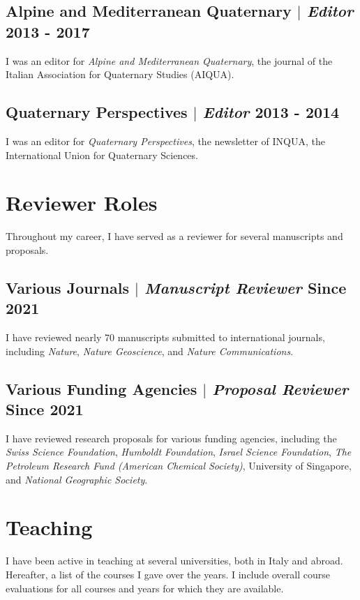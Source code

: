 \documentclass[11pt]{article}
\begin{document}
\subsection{Alpine and Mediterranean Quaternary $|$ {\normalfont\textit{Editor}} \hfill 2013 - 2017}
{\footnotesize I was an editor for \textit{Alpine and Mediterranean Quaternary}, the journal of the Italian Association for Quaternary Studies (AIQUA).}
\bigskip

\subsection{Quaternary Perspectives $|$ {\normalfont\textit{Editor}} \hfill 2013 - 2014}
{\footnotesize I was an editor for \textit{Quaternary Perspectives}, the newsletter of INQUA, the International Union for Quaternary Sciences.}

\section{Reviewer Roles}
{\normalfont Throughout my career, I have served as a reviewer for several manuscripts and proposals.}\\

\bigskip

\subsection{Various Journals $|$ {\normalfont\textit{Manuscript Reviewer}} \hfill Since 2021}
{\footnotesize I have reviewed nearly 70 manuscripts submitted to international journals, including \textit{Nature}, \textit{Nature Geoscience}, and \textit{Nature Communications}.}
\bigskip

\subsection{Various Funding Agencies $|$ {\normalfont\textit{Proposal Reviewer}} \hfill Since 2021}
{\footnotesize I have reviewed research proposals for various funding agencies, including the \textit{Swiss Science Foundation}, \textit{Humboldt Foundation}, \textit{Israel Science Foundation}, \textit{The Petroleum Research Fund (American Chemical Society)}, University of Singapore, and \textit{National Geographic Society}.}

\newpage

\section{Teaching}
{\normalfont I have been active in teaching at several universities, both in Italy and abroad. Hereafter, a list of the courses I gave over the years. I include overall course evaluations for all courses and years for which they are available.}\\
\end{document}
